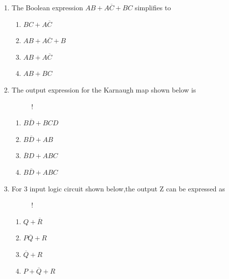 \documentclass[journal,12pt,twocolumn]{IEEEtran}
\begin{document}
\begin{enumerate}
                                   
    \item The Boolean expression $AB+A\overline{C}+BC$ simplifies to
    
     \begin{enumerate}
      \item $BC+A\overline{C}$
      \item $AB+A\overline{C}+B$
      \item $AB+A\overline{C}$
      \item $AB+BC$
    \end{enumerate}
    \item The output expression for the Karnaugh map shown below is 
    \begin{figure}[!h]
\centering
\resizebox {\columnwidth} {!} {

}
\caption{}
\end{figure}
%
                        \begin{enumerate}
      \item $B\overline{D}+BCD$
      \item $B\overline{D}+AB$
      \item $\overline{B}D+ABC$
      \item $B\overline{D}+ABC$
    \end{enumerate}
    \item For 3 input logic circuit shown below,the output Z can be expressed as
    \begin{figure}[!h]
\centering
\resizebox {\columnwidth} {!} {

}
\caption{}
\end{figure}
    \begin{enumerate}
      \item $Q+\overline{R}$
      \item $P\overline{Q}+R$
      \item $\overline{Q}+R$
      \item $P+\overline{Q}+R$

\end{enumerate}
\end{enumerate}
\end{document}
